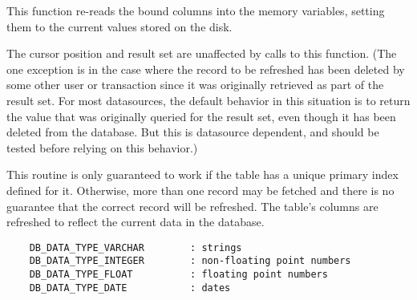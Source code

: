 
This function re-reads the bound columns into the memory variables, setting
them to the current values stored on the disk.

The cursor position and result set are unaffected by calls to this function.
(The one exception is in the case where the record to be refreshed has been
deleted by some other user or transaction since it was originally retrieved
as part of the result set.  For most datasources, the default behavior in
this situation is to return the value that was originally queried for the
result set, even though it has been deleted from the database.  But this is
datasource dependent, and should be tested before relying on this behavior.)


This routine is only guaranteed to work if the table has a unique primary
index defined for it.  Otherwise, more than one record may be fetched and
there is no guarantee that the correct record will be refreshed.  The
table's columns are refreshed to reflect the current data in the database.

\label{wxdbtablesetcoldefs}





\begin{verbatim}
    DB_DATA_TYPE_VARCHAR        : strings
    DB_DATA_TYPE_INTEGER        : non-floating point numbers
    DB_DATA_TYPE_FLOAT          : floating point numbers
    DB_DATA_TYPE_DATE           : dates
\end{verbatim}


